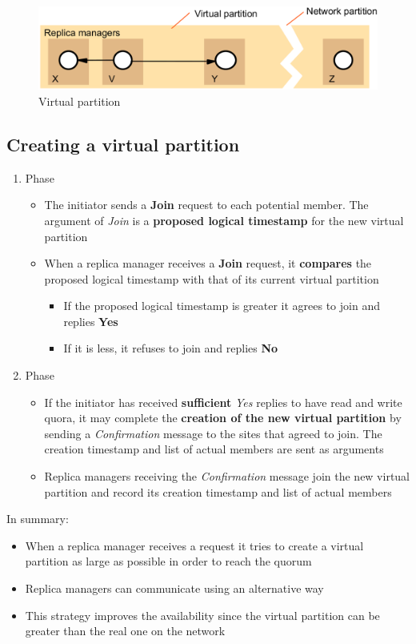 \begin{figure}[!h]
    \centering
    \includegraphics[width=.70\linewidth]{images/roleGroupCommunication/VirtualPartition.png}
    \caption{Virtual partition}
\end{figure}

\subsection{Creating a virtual partition}
\begin{enumerate}
    \item Phase
    \begin{itemize}
        \item The initiator sends a \textbf{Join} request to each potential member. The argument of \textit{Join} is a \textbf{proposed logical timestamp} for the new virtual partition
        \item When a replica manager receives a \textbf{Join} request, it \textbf{compares} the proposed logical timestamp with that of its current virtual partition
        \begin{itemize}
            \item If the proposed logical timestamp is greater it agrees to join and replies \textbf{Yes}
            \item If it is less, it refuses to join and replies \textbf{No}
        \end{itemize}
    \end{itemize}
    \item Phase
    \begin{itemize}
        \item If the initiator has received \textbf{sufficient} \textit{Yes} replies to have read and write quora, it may complete the \textbf{creation of the new virtual partition} by sending a \textit{Confirmation} message to the sites that agreed to join. The creation timestamp and list of actual members are sent as arguments
        \item Replica managers receiving the \textit{Confirmation} message join the new virtual partition and record its creation timestamp and list of actual members
    \end{itemize}
\end{enumerate}

In summary:
\begin{itemize}
    \item  When a replica manager receives a request it tries to create a virtual partition as large as possible in order to reach the quorum
    \item Replica managers can communicate using an alternative way
    \item This strategy improves the availability since the virtual partition can be greater than the real one on the network
\end{itemize}
